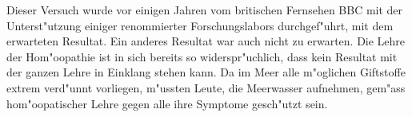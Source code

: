 Dieser Versuch wurde vor einigen Jahren vom britischen Fernsehen BBC mit der
Unterst"utzung einiger renommierter Forschungslabors durchgef"uhrt, mit dem
erwarteten Resultat.
Ein anderes Resultat war auch nicht zu erwarten. Die Lehre der Hom"oopathie
ist in sich bereits so widerspr"uchlich, dass kein Resultat mit der ganzen
Lehre in Einklang stehen kann.
Da im Meer alle m"oglichen Giftstoffe extrem verd"unnt vorliegen, m"ussten
Leute, die Meerwasser aufnehmen, gem"ass hom"oopatischer Lehre gegen alle
ihre Symptome gesch"utzt sein.

